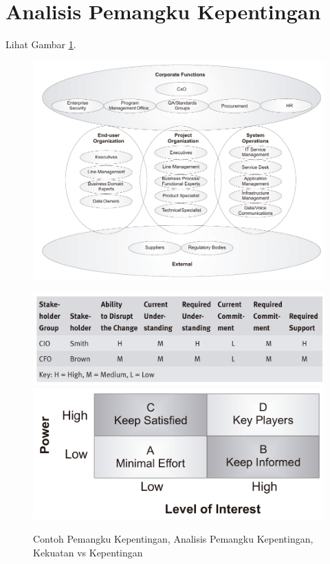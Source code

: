 \section{Analisis Pemangku Kepentingan}
\label{sec:stakholders}
Lihat Gambar \ref{fig:stakeholders}.
\begin{figure}[h!]
	\centering
	\begin{minipage}[bt]{0.496\textwidth}
		\centering
		\includegraphics[width=\textwidth]{../figures/sample_stakeholders}
	\end{minipage}
	\hfill
	\begin{minipage}[bt]{0.496\textwidth}
		\centering
		\includegraphics[width=\textwidth]{../figures/stakeholder_analysis}
		\includegraphics[width=\textwidth]{../figures/power_vs_interest}
	\end{minipage}
	\caption{Contoh Pemangku Kepentingan, Analisis Pemangku Kepentingan, Kekuatan vs Kepentingan}
	\label{fig:stakeholders}
\end{figure}

